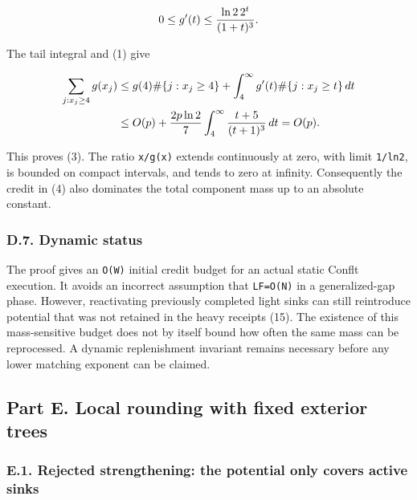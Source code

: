 \[
0\le g'(t)\le {\ln2\,2^t\over(1+t)^3}.
\]

The tail integral and (1) give

\[
\begin{aligned}
\sum_{j:x_j\ge4}g(x_j)
&\le g(4)\#\{j:x_j\ge4\}
      +\int_4^\infty g'(t)\#\{j:x_j\ge t\}\,dt\\
&\le O(p)+{2p\ln2\over7}
              \int_4^\infty{t+5\over(t+1)^3}\,dt
=O(p).
\end{aligned}
\]

This proves (3). The ratio \texttt{x/g(x)} extends continuously at zero, with limit \texttt{1/ln2}, is bounded on compact intervals, and tends to zero at infinity. Consequently the credit in (4) also dominates the total component mass up to an absolute constant.

\hypertarget{af-385fd70686-d.7.-dynamic-status}{%
\subsubsection{D.7. Dynamic status}\label{af-385fd70686-d.7.-dynamic-status}}

The proof gives an \texttt{O(W)} initial credit budget for an actual static Conflt execution. It avoids an incorrect assumption that \texttt{LF=O(N)} in a generalized-gap phase. However, reactivating previously completed light sinks can still reintroduce potential that was not retained in the heavy receipts (15). The existence of this mass-sensitive budget does not by itself bound how often the same mass can be reprocessed. A dynamic replenishment invariant remains necessary before any lower matching exponent can be claimed.

\hypertarget{af-385fd70686-part-e.-local-rounding-with-fixed-exterior-trees}{%
\subsection{Part E. Local rounding with fixed exterior trees}\label{af-385fd70686-part-e.-local-rounding-with-fixed-exterior-trees}}

\hypertarget{af-385fd70686-e.1.-rejected-strengthening-the-potential-only-covers-active-sinks}{%
\subsubsection{E.1. Rejected strengthening: the potential only covers active sinks}\label{af-385fd70686-e.1.-rejected-strengthening-the-potential-only-covers-active-sinks}}

